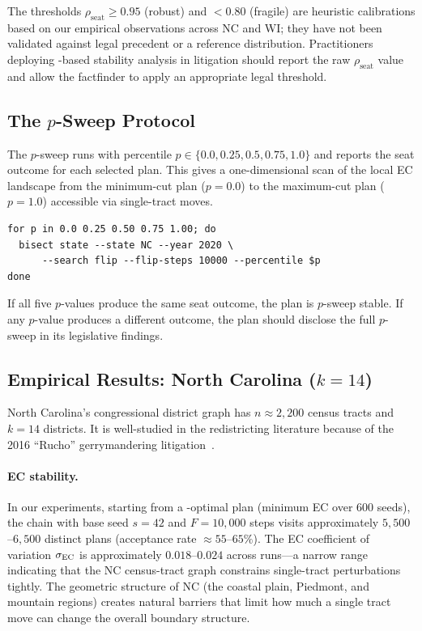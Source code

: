 \begin{remark}
\label{rem:thresholds}
The thresholds $\rho_{\mathrm{seat}} \geq 0.95$ (robust) and $< 0.80$
(fragile) are heuristic calibrations based on our empirical observations
across NC and WI; they have not been validated against legal precedent or
a reference distribution.
Practitioners deploying \flip{}-based stability analysis in litigation
should report the raw $\rho_{\mathrm{seat}}$ value and allow the
factfinder to apply an appropriate legal threshold.
\end{remark}

\subsection{The $p$-Sweep Protocol}

The $p$-sweep runs \flip{} with percentile $p \in \{0.0, 0.25, 0.5, 0.75, 1.0\}$
and reports the seat outcome for each selected plan.
This gives a one-dimensional scan of the local EC landscape from the
minimum-cut plan ($p = 0.0$) to the maximum-cut plan ($p = 1.0$) accessible
via single-tract moves.

\begin{verbatim}
for p in 0.0 0.25 0.50 0.75 1.00; do
  bisect state --state NC --year 2020 \
      --search flip --flip-steps 10000 --percentile $p
done
\end{verbatim}

If all five $p$-values produce the same seat outcome, the plan is
$p$-sweep stable.
If any $p$-value produces a different outcome, the plan should disclose the
full $p$-sweep in its legislative findings.

\subsection{Empirical Results: North Carolina ($k = 14$)}

North Carolina's congressional district graph has $n \approx 2{,}200$ census
tracts and $k = 14$ districts.
It is well-studied in the redistricting literature because of the 2016
``Rucho'' gerrymandering litigation~\citep{rucho2019}.

\paragraph{EC stability.}
In our experiments, starting from a \cs{}-optimal plan (minimum EC over
600 seeds), the \flip{} chain with base seed $s = 42$ and $F = 10{,}000$
steps visits approximately $5{,}500$--$6{,}500$ distinct plans (acceptance
rate $\approx 55$--$65\%$).
The EC coefficient of variation $\sigma_{\mathrm{EC}}$ is approximately $0.018$--$0.024$
across runs---a narrow range indicating that the NC census-tract graph
constrains single-tract perturbations tightly.
The geometric structure of NC (the coastal plain, Piedmont, and mountain
regions) creates natural barriers that limit how much a single tract move
can change the overall boundary structure.

